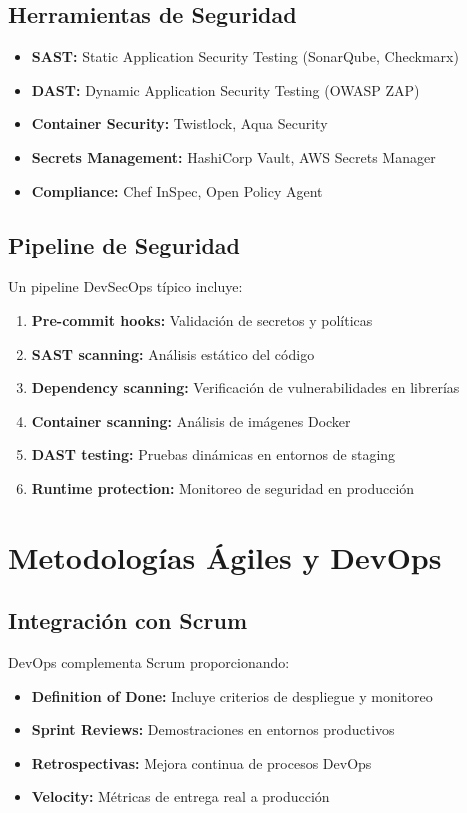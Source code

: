 \documentclass[12pt,a4paper]{article}
\begin{document}
\subsection{Herramientas de Seguridad}
\begin{itemize}
    \item \textbf{SAST:} Static Application Security Testing (SonarQube, Checkmarx)
    \item \textbf{DAST:} Dynamic Application Security Testing (OWASP ZAP)
    \item \textbf{Container Security:} Twistlock, Aqua Security
    \item \textbf{Secrets Management:} HashiCorp Vault, AWS Secrets Manager
    \item \textbf{Compliance:} Chef InSpec, Open Policy Agent
\end{itemize}

\subsection{Pipeline de Seguridad}
Un pipeline DevSecOps típico incluye:
\begin{enumerate}
    \item \textbf{Pre-commit hooks:} Validación de secretos y políticas
    \item \textbf{SAST scanning:} Análisis estático del código
    \item \textbf{Dependency scanning:} Verificación de vulnerabilidades en librerías
    \item \textbf{Container scanning:} Análisis de imágenes Docker
    \item \textbf{DAST testing:} Pruebas dinámicas en entornos de staging
    \item \textbf{Runtime protection:} Monitoreo de seguridad en producción
\end{enumerate}

\section{Metodologías Ágiles y DevOps}

\subsection{Integración con Scrum}
DevOps complementa Scrum proporcionando:
\begin{itemize}
    \item \textbf{Definition of Done:} Incluye criterios de despliegue y monitoreo
    \item \textbf{Sprint Reviews:} Demostraciones en entornos productivos
    \item \textbf{Retrospectivas:} Mejora continua de procesos DevOps
    \item \textbf{Velocity:} Métricas de entrega real a producción
\end{itemize}
\end{document}
